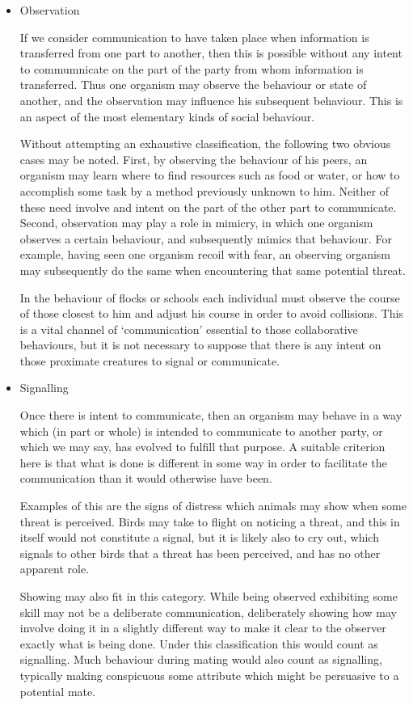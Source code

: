 \documentclass[10pt,titlepage]{book}
\begin{document}
\begin{itemize}
\item Observation

  If we consider communication to have taken place when information is transferred from one part to another, then this is possible without any intent to commumnicate on the part of the party from whom information is transferred.
  Thus one organism may observe the behaviour or state of another, and the observation may influence his subsequent behaviour.
  This is an aspect of the most elementary kinds of social behaviour.

  Without attempting an exhaustive classification, the following two obvious cases may be noted.
  First, by observing the behaviour of his peers, an organism may learn where to find resources such as food or water, or how to accomplish some task by a method previously unknown to him.
  Neither of these need involve and intent on the part of the other part to communicate.
  Second, observation may play a role in mimicry, in which one organism observes a certain behaviour, and subsequently mimics that behaviour.
  For example, having seen one organism recoil with fear, an observing organism may subsequently do the same when encountering that same potential threat.

  In the behaviour of flocks or schools each individual must observe the course of those closest to him and adjust his course in order to avoid collisions.
  This is a vital channel of `communication' essential to those collaborative behaviours, but it is not necessary to suppose that there is any intent on those proximate creatures to signal or communicate.

\item Signalling

  Once there is intent to communicate, then an organism may behave in a way which (in part or whole) is intended to communicate to another party, or which we may say, has evolved to fulfill that purpose.
  A suitable criterion here is that what is done is different in some way in order to facilitate the communication than it would otherwise have been.

  Examples of this are the signs of distress which animals may show when some threat is perceived.
  Birds may take to flight on noticing a threat, and this in itself would not constitute a signal, but it is likely also to cry out, which signals to other birds that a threat has been perceived, and has no other apparent role.

  Showing may also fit in this category.
  While being observed exhibiting some skill may not be a deliberate communication, deliberately showing how may involve doing it in a slightly different way to make it clear to the observer exactly what is being done.
  Under this classification this would count as signalling.
  Much behaviour during mating would also count as signalling, typically making conspicuous some attribute which might be persuasive to a potential mate.


\end{itemize}
\end{document}
